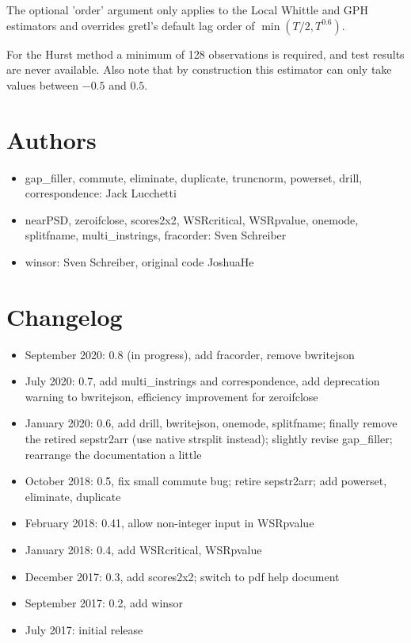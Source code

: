 \documentclass[11pt,english]{article}
\begin{document}
The optional 'order' argument only applies to the Local Whittle and GPH estimators and
overrides gretl's default lag order of $\min(T/2, T^{0.6})$.

For the Hurst method a minimum of 128 observations is required, and test results are
never available. Also note that by construction this estimator can only take values between
$-0.5$ and $0.5$.

\section{Authors}
\begin{itemize}
\item gap\_filler, commute, eliminate, duplicate, truncnorm, powerset,
  drill, correspondence: Jack Lucchetti

\item nearPSD, zeroifclose, scores2x2, WSRcritical, WSRpvalue, onemode,
splitfname, multi\_instrings, fracorder:
Sven Schreiber

\item winsor: Sven Schreiber, original code JoshuaHe

\end{itemize}

\section{Changelog }
\begin{itemize}
\item September 2020: 0.8 (in progress), add fracorder, remove bwritejson
\item July 2020: 0.7, add multi\_instrings and correspondence, add deprecation warning to
bwritejson, efficiency improvement for zeroifclose
\item January 2020: 0.6, add drill, bwritejson, onemode, splitfname;
  finally remove the retired sepstr2arr (use native strsplit instead);
  slightly revise gap\_filler; rearrange the documentation a little
\item October 2018: 0.5, fix small commute bug; retire sepstr2arr; add powerset,
  eliminate, duplicate
\item February 2018: 0.41, allow non-integer input in WSRpvalue
\item January 2018: 0.4, add WSRcritical, WSRpvalue
\item December 2017: 0.3, add scores2x2; switch to pdf help document
\item September 2017: 0.2, add winsor
\item July 2017: initial release
\end{itemize}
\end{document}
